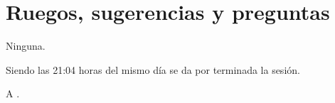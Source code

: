 \documentclass[12pt,twoside,openany,a4paper]{book}
\begin{document}
    \section{Ruegos, sugerencias y preguntas}
    Ninguna.

    \clearpage
    Siendo las 21:04 horas del mismo día se da por terminada la sesión.

    A \Date.
    \vspace{10mm}
\end{document}

